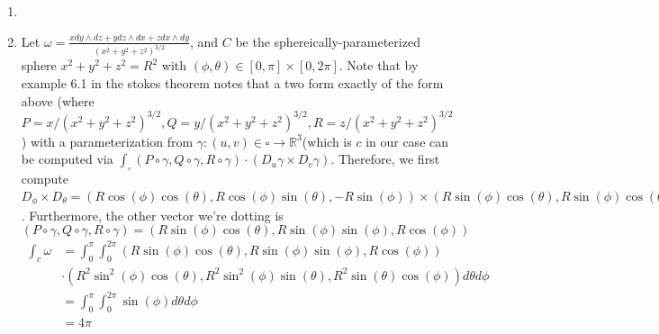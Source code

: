 \documentclass[12pt, letterpaper]{article}
\newcommand{\R}{\mathbb{R}}
\begin{document}
\begin{enumerate}
\begin{enumerate}
\begin{itemize}
			\item $\frac{\partial f}{\partial \phi} 
			= \frac{\partial f}{\partial x} \frac{\partial x}{\partial \phi} + \frac{\partial f}{\partial y} \frac{\partial y}{\partial \phi} + \frac{\partial f}{\partial z} \frac{\partial z}{\partial \phi} = \frac{\partial f}{\partial x} r\cos(\phi)\cos(\theta) + \frac{\partial f}{\partial y} r \cos(\phi)\sin(\theta) - \frac{\partial f}{\partial z} r\sin(\phi)$
			\item $\frac{\partial f}{\partial \theta} 
			= \frac{\partial f}{\partial x} \frac{\partial x}{\partial \theta} + \frac{\partial f}{\partial y} \frac{\partial y}{\partial \theta} + \frac{\partial f}{\partial z} \frac{\partial z}{\partial \theta} = -\frac{\partial f}{\partial x}r\sin(\phi)\cos(\theta) + \frac{\partial f}{\partial y} r \sin(\phi)\cos(\theta)$
		\end{itemize}
	\end{enumerate}
	\item 
	\item Let 
	$\omega = \frac{x dy \wedge dz + y dz \wedge dx + z dx \wedge dy}{(x^2 + y^2 + z^2)^{3/2}}$, and $C$ be 
	the sphereically-parameterized sphere $x^2 + y^2 + z^2 = R^2$ with $(\phi, \theta) \in [0,\pi] \times [0,2 \pi]$.
	Note that by example 6.1 in the stokes theorem notes 
	that a two form exactly of the form above 
	(where $P = x/(x^2 + y^2 + z^2)^{3/2}, Q = y/(x^2 + y^2 + z^2)^{3/2}, R = z/(x^2 + y^2 + z^2)^{3/2}$) with a parameterization 
	from $\gamma : (u,v) \in \square \to \R^3$(which is $c$ in our case
	can be computed via $\int_\square (P \circ \gamma, 
	Q \circ \gamma,R \circ \gamma)\cdot (D_u \gamma \times
	D_v \gamma)$.   Therefore, we first compute 
	$D_\phi \times D_\theta = (R \cos(\phi) \cos(\theta), 
	R \cos(\phi)\sin(\theta), -R\sin(\phi)) \times 
	(R \sin(\phi)\cos(\theta), R  \sin(\phi)\cos(\theta),0)
	= (R^2\sin^2(\phi)\cos(\theta), R^2\sin^2(\phi)\sin(\theta), R^2 \sin(\theta)\cos(\phi))$.  Furthermore, the other vector 
	we're dotting is \\
	$(P \circ \gamma, 
	Q \circ \gamma,R \circ \gamma) = (R \sin(\phi)\cos(\theta), R\sin(\phi)\sin(\phi), R\cos(\phi))$
	\begin{align*}
		\int_c \omega &= \int_{0}^\pi \int_0^{2 \pi} 
		(R \sin(\phi)\cos(\theta), R\sin(\phi)\sin(\phi), R\cos(\phi))\\ &\cdot (R^2\sin^2(\phi)\cos(\theta), R^2\sin^2(\phi)\sin(\theta), R^2 \sin(\theta)\cos(\phi))
		d\theta d \phi\\
		&= \int_0^\pi \int_0^{2 \pi} \sin(\phi) d \theta d \phi\\
		&= 4\pi
	\end{align*}
\end{enumerate}
\end{document}

